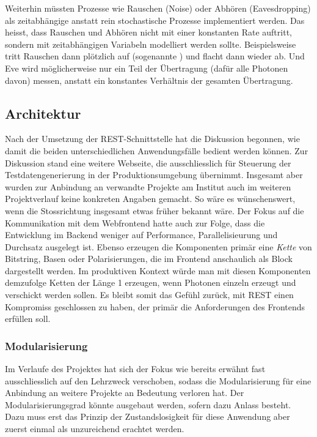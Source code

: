 \documentclass[a4paper,10.2pt,pdftex]{scrartcl}%
\newcommand{\q}[1]{\iflanguage{ngerman}{\flqq#1\frqq}{``#1''}}
\begin{document}
Weiterhin müssten Prozesse wie Rauschen (Noise) oder Abhören (Eavesdropping) als zeitabhängige anstatt rein stochastische Prozesse implementiert werden. Das heisst, dass Rauschen und Abhören nicht mit einer konstanten Rate auftritt, sondern mit zeitabhängigen Variabeln modelliert werden sollte. Beispielsweise tritt Rauschen dann plötzlich auf (sogenannte \q{bursts}) und flacht dann wieder ab. Und Eve wird möglicherweise nur ein Teil der Übertragung (dafür alle Photonen davon) messen, anstatt ein konstantes Verhältnis der gesamten Übertragung.

\subsection{Architektur}
Nach der Umsetzung der REST-Schnittstelle hat die Diskussion begonnen, wie damit die beiden unterschiedlichen Anwendungsfälle bedient werden können. Zur Diskussion stand eine weitere Webseite, die ausschliesslich für Steuerung der Testdatengenerierung in der Produktionsumgebung übernimmt. Insgesamt aber wurden zur Anbindung an verwandte Projekte am Institut auch im weiteren Projektverlauf keine konkreten Angaben gemacht. So wäre es wünschenswert, wenn die Stossrichtung insgesamt etwas früher bekannt wäre. Der Fokus auf die Kommunikation mit dem Webfrontend hatte auch zur Folge, dass die Entwicklung im Backend weniger auf Performance, Parallelisieurung und Durchsatz ausgelegt ist. Ebenso erzeugen die Komponenten primär eine \emph{Kette} von Bitstring, Basen oder Polarisierungen, die im Frontend anschaulich als Block dargestellt werden. Im produktiven Kontext würde man mit diesen Komponenten demzufolge Ketten der Länge 1 erzeugen, wenn Photonen einzeln erzeugt und verschickt werden sollen. Es bleibt somit das Gefühl zurück, mit REST einen Kompromiss geschlossen zu haben, der primär die Anforderungen des Frontends erfüllen soll. 


\subsubsection{Modularisierung}
Im Verlaufe des Projektes hat sich der Fokus wie bereits erwähnt fast ausschliesslich auf den Lehrzweck verschoben, sodass die Modularisierung für eine Anbindung an weitere Projekte an Bedeutung verloren hat. Der Modularisierungsgrad könnte ausgebaut werden, sofern dazu Anlass besteht. Dazu muss erst das Prinzip der Zustandslosigkeit für diese Anwendung aber zuerst einmal als unzureichend erachtet werden.  
\end{document}

